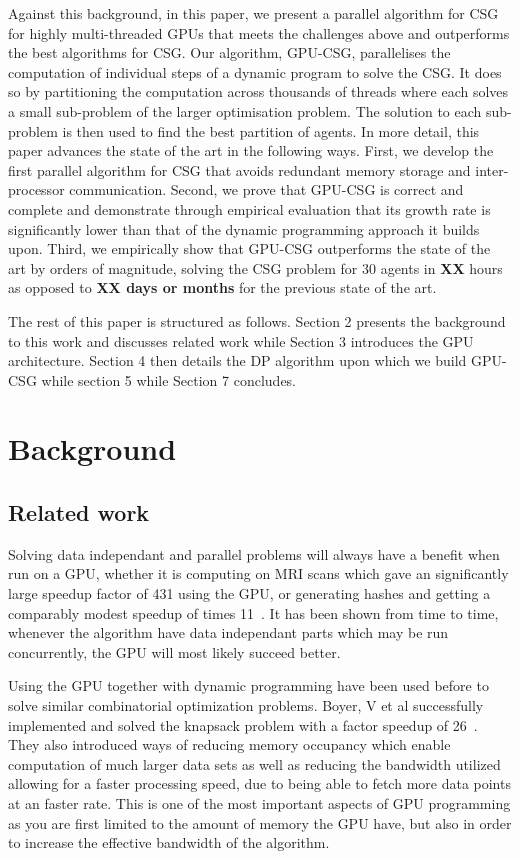 \documentclass{llncs}
\begin{document}
Against this background, in this paper, we present a parallel algorithm for CSG for highly multi-threaded GPUs that meets the challenges above and outperforms the best algorithms for CSG. Our algorithm, GPU-CSG, parallelises the computation of individual steps of a dynamic program to solve the CSG. It does so by partitioning the computation across thousands of threads where each solves a small sub-problem of the larger optimisation problem. The solution to each sub-problem is then used to find the best partition of agents. In more detail, this paper advances the state of the art in the following ways. First, we develop the first parallel  algorithm for CSG that avoids redundant memory storage and inter-processor communication. Second, we prove that GPU-CSG is correct and complete and demonstrate through empirical evaluation that its growth rate is significantly lower than that of the dynamic programming approach it builds upon. Third, we empirically show that GPU-CSG outperforms the state of the art by orders of magnitude, solving the CSG problem for 30 agents in \textbf{XX} hours as opposed to \textbf{XX days or months} for the previous state of the art.

The rest of this paper is structured as follows. Section 2 presents the
background to this work and discusses related work while Section 3 introduces
the GPU architecture. Section 4 then details the DP algorithm upon which we build GPU-CSG
while section 5 while Section 7 concludes.

\section{Background}

\subsection{Related work}


Solving data independant and parallel problems will always have a benefit when run on a GPU, 
whether it is computing on MRI scans which gave an significantly large speedup factor of 431 using the GPU,
or generating hashes and getting a comparably modest speedup of times 11~\cite{ryoo2008optimization}. 
It has been shown from time to time, whenever the algorithm have data independant parts which may be run concurrently,
the GPU will most likely succeed better.

Using the GPU together with dynamic programming have been used before to solve similar combinatorial optimization problems. 
Boyer, V et al successfully implemented and solved the knapsack problem with a factor speedup of 26~\cite{boyer2012solving}. 
They also introduced ways of reducing memory occupancy which enable computation of much larger data sets as well as reducing the 
bandwidth utilized allowing for a faster processing speed, due to being able to fetch more data points at an faster rate. 
This is one of the most important aspects of GPU programming as you are first limited to the amount of memory the GPU have, 
but also in order to increase the effective bandwidth of the algorithm.
\end{document}
